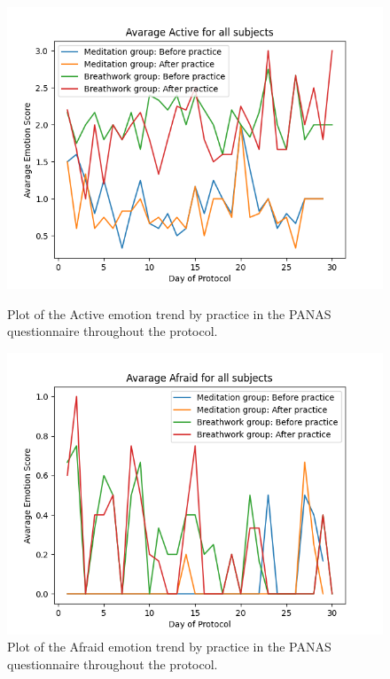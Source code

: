 \begin{figure}
    \centering
    \begin{minipage}{0.49\linewidth}
        \includegraphics[width=\linewidth]{Figures/panas/emotions/Active.png}
        \caption{Plot of the Active emotion trend by practice in the PANAS questionnaire throughout the protocol.}
        \label{fig:active_by_practice}
    \end{minipage}
    \hfill %
    \begin{minipage}{0.49\linewidth}
        \includegraphics[width=\linewidth]{Figures/panas/emotions/Afraid.png}
        \caption{Plot of the Afraid emotion trend by practice in the PANAS questionnaire throughout the protocol.}
        \label{fig:afraid_by_practice}
    \end{minipage}
\end{figure} %

